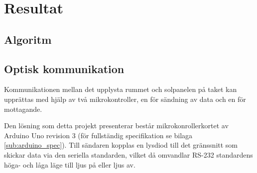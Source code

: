 \section{Resultat} %
\label{sec:resultat}
    \subsection{Algoritm} %
    \label{sub:algoritm}

    \subsection{Optisk kommunikation} %
    \label{sub:optisk_kommunikation}

        Kommunikationen mellan det upplysta rummet och solpanelen på taket kan upprättas med hjälp av två mikrokontroller, en för sändning av data och en för mottagande. \bigskip

        Den lösning som detta projekt presenterar består mikrokonrollerkortet av Arduino Uno revision 3 (för fullständig specifikation se bilaga \ref{sub:arduino_spec}).\cite{ardu} Till sändaren kopplas en lysdiod till det gränssnitt som skickar data via den seriella standarden, vilket då omvandlar RS-232 standardens höga- och låga läge till ljus på eller ljus av.
    
